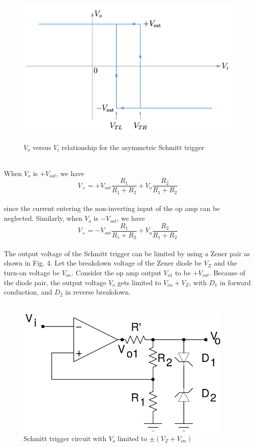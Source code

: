 \documentclass[12pt]{article}
\begin{document}
      \begin{figure}[H]
            \centering
            \includegraphics[width = 0.7\linewidth, height = 3in]{reports/lab2/assym.png}
            \caption{$V_o$ versus $V_i$ relationship for the asymmetric Schmitt trigger}
        \end{figure}
        \\
        When $V_o$ is $+V_{sat}$, we have
        \begin{equation}
            V_+ = +V_{sat}\frac{R_1}{R_1+R_2} + V_a\frac{R_2}{R_1+R_2} 
        \end{equation}
        \\
        since the current entering the non-inverting input of the op amp can be neglected. Similarly, when $V_o$ is $−V_{sat}$, we have
        \\
        \begin{equation}
            V_+ = -V_{sat}\frac{R_1}{R_1+R_2} + V_a\frac{R_2}{R_1+R_2} 
        \end{equation}
        \\
        The output voltage of the Schmitt trigger can be limited by using a Zener pair as shown in Fig. 4. Let the breakdown voltage of the Zener diode be $V_Z$ and the turn-on voltage be $V_{on}$. Consider the op amp output $V_{o1}$ to be $+V_{sat}$. Because of the diode pair, the output voltage $V_o$ gets limited to $V_{on} + V_Z$, with $D_1$ in forward conduction, and $D_2$ in reverse breakdown.\\
        \\
        \begin{figure}[H]
            \centering
            \includegraphics[width = 0.6\linewidth, height = 2.5in]{reports/lab2/zener.png}
            \caption{Schmitt trigger circuit with $V_o$ limited to $±(V_Z + V_{on} )$}
        \end{figure}
\end{document}
